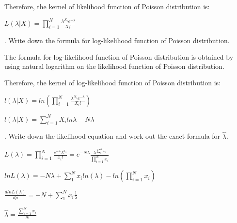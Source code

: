 \documentclass[12pt, oneside]{report}\usepackage[]{graphicx}\usepackage[]{color}
\begin{document}
Therefore, the kernel of likelihood function of Poisson distribution is: \newline

$L(\lambda|X) = \displaystyle\prod_{i=1}^{N} \frac{\lambda^{X_i} e^{-\lambda}}{X_i !}$ \newline


. Write down the formula for log-likelihood function of Poisson distribution. \newline

The formula for log-likelihood function of Poisson distribution is obtained by using natural logarithm on the likelihood function of Poisson distribution. \newline

Therefore, the kernel of log-likelihood function of Poisson distribution is: \newline

$l(\lambda|X) = ln \left( \displaystyle\prod_{i=1}^{N} \frac{\lambda^{X_i} e^{-\lambda}}{X_i !} \right)$ \newline

$l(\lambda|X) = \displaystyle\sum_{i=1}^{N} X_i ln \lambda - N \lambda$ \newline

. Write down the likelihood equation and work out the exact formula for $\hat{\lambda}$. \newline

$L(\lambda) =  \displaystyle\prod_{i=1}^{N} \frac{e^{-\lambda}\lambda^{x_i}}{x_i !} = e^{-N\lambda} \frac{\lambda^{\sum_{1}^{N}x_i}}{\prod_{i=1}^{N} x_i}$ \newline

$ln L(\lambda) = -N\lambda + \displaystyle\sum_{1}^{N}x_iln(\lambda) - ln\left(\displaystyle\prod_{i=1}^{N} x_i\right)$ \newline

$\frac{dlnL(\lambda)}{dp} = -N + \displaystyle\sum_{1}^{N} x_i \frac{1}{\lambda}$ \newline

$\hat{\lambda} = \frac{\sum_{i=1}^{N}x_i}{N}$ \newline
\end{document}
